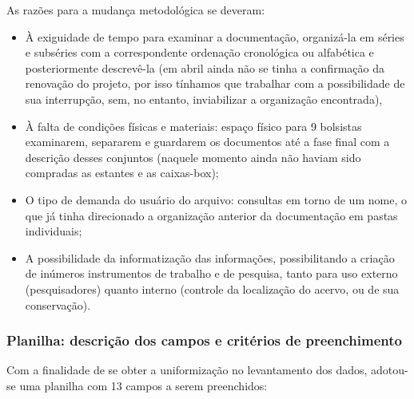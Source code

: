 As razões para a mudança metodológica se deveram: 
\begin{itemize}
	\item À exiguidade de tempo para examinar a documentação, organizá-la em séries e subséries com a correspondente ordenação cronológica ou alfabética e posteriormente descrevê-la (em abril ainda não se tinha a confirmação da renovação do projeto, por isso tínhamos que trabalhar com a possibilidade de sua interrupção, sem, no entanto, inviabilizar a organização encontrada), 
	\item À falta de condições físicas e materiais: espaço físico para 9 bolsistas examinarem, separarem e guardarem os documentos até a fase final com a descrição desses conjuntos (naquele momento ainda não haviam sido compradas as estantes e as caixas-box); 
	\item O tipo de demanda do usuário do arquivo: consultas em torno de um nome, o que já tinha direcionado a organização anterior da documentação em pastas individuais; 
	\item A possibilidade da informatização das informações, possibilitando a criação de inúmeros instrumentos de trabalho e de pesquisa, tanto para uso externo (pesquisadores) quanto interno (controle da localização do acervo, ou de sua conservação).
\end{itemize}

\subsubsection{Planilha: descrição dos campos e critérios de preenchimento}

Com a finalidade de se obter a uniformização no levantamento dos dados, adotou-se uma planilha com 13 campos a serem preenchidos:

